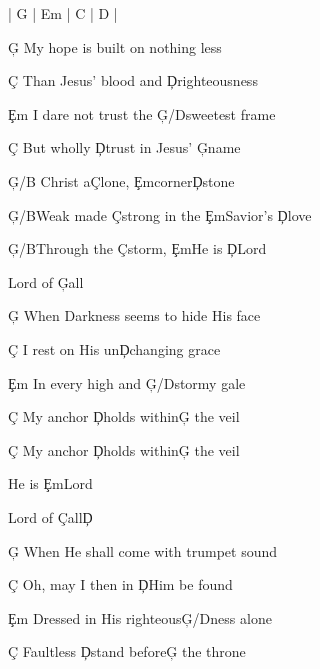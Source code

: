 \documentclass[9pt]{extarticle}
\begin{document}
\bsong

\bi
| G | Em | C | D |
\ei

\bv
\c{G} My hope is built on nothing less

\c{C} Than Jesus' blood and \c{D}righteousness

\c{Em} I dare not trust the \c{G/D}sweetest frame

\c{C} But wholly \c{D}trust in Jesus' \c{G}name
\ev

\bc
\c{G/B} Christ a\c{C}lone, \c{Em}corner\c{D}stone

\c{G/B}Weak made \c{C}strong in the \c{Em}Savior's \c{D}love

\c{G/B}Through the \c{C}storm, \c{Em}He is \c{D}Lord

Lord of \c{G}all
\ec

\bv
\c{G} When Darkness seems to hide His face

\c{C} I rest on His un\c{D}changing grace

\c{Em} In every high and \c{G/D}stormy gale

\c{C} My anchor \c{D}holds within\c{G} the veil

\c{C} My anchor \c{D}holds within\c{G} the veil
\ev


\bt
He is \c{Em}Lord

Lord of \c{C}all\c{D}
\et


\bv
\c{G} When He shall come with trumpet sound

\c{C} Oh, may I then in \c{D}Him be found

\c{Em} Dressed in His righteous\c{G/D}ness alone

\c{C} Faultless \c{D}stand before\c{G} the throne
\ev


\esong
\end{document}
